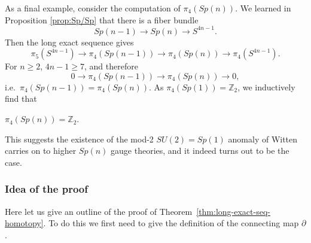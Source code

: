 \documentclass[12pt]{article}
\numberwithin{equation}{section}
\numberwithin{figure}{section}
\theoremstyle{remark}
\def\bZ{\mathbb{Z}}
\begin{document}
As a final example, consider the computation of $\pi_4(Sp(n))$.
We learned in Proposition \ref{prop:Sp/Sp} that there is a fiber bundle
\begin{equation}
  Sp(n-1)\to Sp(n)\to S^{4n-1}.
\end{equation} Then the long exact sequence gives
\begin{equation}
  \pi_5(S^{4n-1})\to \pi_4(Sp(n-1))\to \pi_4(Sp(n))\to \pi_4(S^{4n-1}).
\end{equation} For $n\ge 2$, $4n-1\ge 7$, and therefore 
\begin{equation}
  0\to \pi_4(Sp(n-1))\to \pi_4(Sp(n))\to 0,
\end{equation} i.e.~$\pi_4(Sp(n-1))=\pi_4(Sp(n))$.
As $\pi_4(Sp(1))=\bZ_2$, we inductively find that 
\begin{example}
  $\pi_4(Sp(n))=\bZ_2$.  
\end{example}
This suggests the existence of the mod-2 $SU(2)=Sp(1)$ anomaly of Witten 
carries on to higher $Sp(n)$ gauge theories,
and it indeed turns out to be the case.


\subsubsection{Idea of the proof}
Here let us give an outline of the proof of Theorem~\ref{thm:long-exact-seq-homotopy}.
To do this we first need to give the definition of the connecting map $\partial$.
\end{document}
